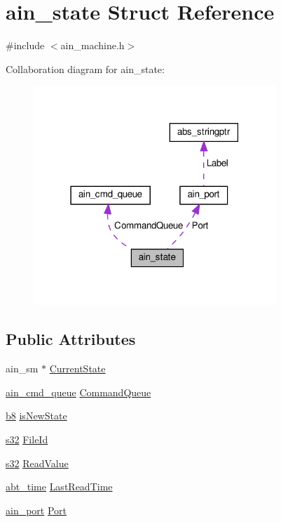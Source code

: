 \hypertarget{structain__state}{}\section{ain\+\_\+state Struct Reference}
\label{structain__state}


{\ttfamily \#include $<$ain\+\_\+machine.\+h$>$}



Collaboration diagram for ain\+\_\+state\+:\nopagebreak
\begin{figure}[H]
\begin{center}
\leavevmode
\includegraphics[width=259pt]{dc/d36/structain__state__coll__graph}
\end{center}
\end{figure}
\subsection*{Public Attributes}
\begin{DoxyCompactItemize}
\item 
ain\+\_\+sm $\ast$ \hyperlink{structain__state_a30ffb18e1b012e8b6550901670be0948}{Current\+State}
\item 
\hyperlink{structain__cmd__queue}{ain\+\_\+cmd\+\_\+queue} \hyperlink{structain__state_a60309c1608932df2e5bb8fa9648db68b}{Command\+Queue}
\item 
\hyperlink{ab__common_8h_a70e369648385b50f2d0588e8e8745275}{b8} \hyperlink{structain__state_a8a2bd2b5d34f6e2d3b7a6270a1b88f26}{is\+New\+State}
\item 
\hyperlink{ab__common_8h_ae9b1af5c037e57a98884758875d3a7c4}{s32} \hyperlink{structain__state_ae58221dfcfb85b30d0a2f348e485d377}{File\+Id}
\item 
\hyperlink{ab__common_8h_ae9b1af5c037e57a98884758875d3a7c4}{s32} \hyperlink{structain__state_a367c606e41f41737fc215f46fbed5271}{Read\+Value}
\item 
\hyperlink{ab__time_8h_adc59735fd0d20e93fe3016c8b6a4f782}{abt\+\_\+time} \hyperlink{structain__state_a871210b0691c94540801b72c3a169f0d}{Last\+Read\+Time}
\item 
\hyperlink{structain__port}{ain\+\_\+port} \hyperlink{structain__state_a916756ec631a54c386895526b3e4a1cb}{Port}
\end{DoxyCompactItemize}


